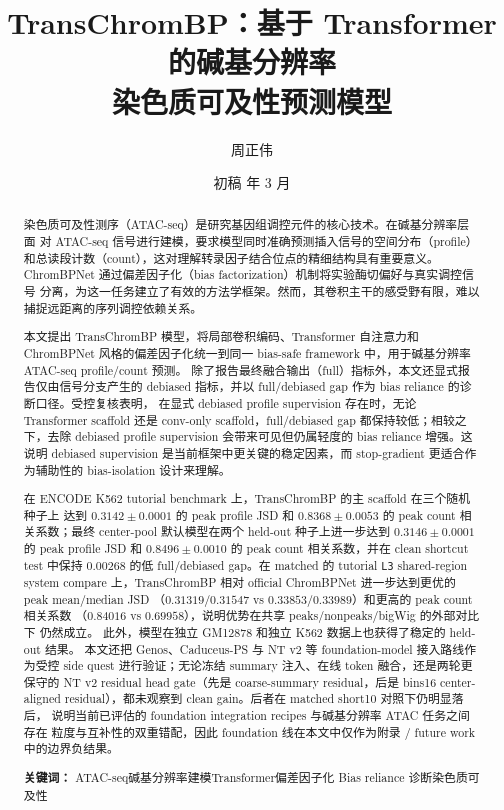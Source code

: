 \documentclass[11pt,a4paper]{ctexart}
\title{TransChromBP：基于 Transformer 的碱基分辨率\\
染色质可及性预测模型}
\author{周正伟}
\date{初稿\quad 2026 年 3 月}
\begin{document}
\maketitle

\begin{abstract}

染色质可及性测序（ATAC-seq）是研究基因组调控元件的核心技术。在碱基分辨率层面
对 ATAC-seq 信号进行建模，要求模型同时准确预测插入信号的空间分布（profile）
和总读段计数（count），这对理解转录因子结合位点的精细结构具有重要意义。
ChromBPNet 通过偏差因子化（bias factorization）机制将实验酶切偏好与真实调控信号
分离，为这一任务建立了有效的方法学框架。然而，其卷积主干的感受野有限，难以
捕捉远距离的序列调控依赖关系。

本文提出 TransChromBP 模型，将局部卷积编码、Transformer 自注意力和 ChromBPNet
风格的偏差因子化统一到同一 bias-safe framework 中，用于碱基分辨率
ATAC-seq profile/count 预测。
除了报告最终融合输出（full）指标外，本文还显式报告仅由信号分支产生的
debiased 指标，并以 full/debiased gap 作为 bias reliance 的诊断口径。受控复核表明，
在显式 debiased profile supervision 存在时，无论 Transformer scaffold 还是
conv-only scaffold，full/debiased gap 都保持较低；相较之下，去除 debiased profile
supervision 会带来可见但仍属轻度的 bias reliance 增强。这说明 debiased supervision
是当前框架中更关键的稳定因素，而 stop-gradient 更适合作为辅助性的 bias-isolation
设计来理解。

在 ENCODE K562 tutorial benchmark 上，TransChromBP 的主 scaffold 在三个随机种子上
达到 $0.3142 \pm 0.0001$ 的 peak profile JSD 和 $0.8368 \pm 0.0053$ 的 peak count
相关系数；最终 center-pool 默认模型在两个 held-out 种子上进一步达到
$0.3146 \pm 0.0001$ 的 peak profile JSD 和 $0.8496 \pm 0.0010$ 的 peak count
相关系数，并在 clean shortcut test 中保持 $0.00268$ 的低 full/debiased gap。在
matched 的 tutorial \texttt{L3} shared-region system compare 上，TransChromBP 相对
official ChromBPNet 进一步达到更优的 peak mean/median JSD
（$0.31319/0.31547$ vs $0.33853/0.33989$）和更高的 peak count 相关系数
（$0.84016$ vs $0.69958$），说明优势在共享 peaks/nonpeaks/bigWig 的外部对比下
仍然成立。
此外，模型在独立 GM12878 和独立 K562 数据上也获得了稳定的 held-out 结果。
本文还把 Genos、Caduceus-PS 与 NT v2 等 foundation-model 接入路线作为受控
side quest 进行验证；无论冻结 summary 注入、在线 token 融合，还是两轮更保守的
NT v2 residual head gate（先是 coarse-summary residual，后是 bins16 center-aligned
residual），都未观察到 clean gain。后者在 matched short10 对照下仍明显落后，
说明当前已评估的 foundation integration recipes 与碱基分辨率 ATAC 任务之间存在
粒度与互补性的双重错配，因此 foundation 线在本文中仅作为附录 / future work
中的边界负结果。

\bigskip
\noindent\textbf{关键词：}
ATAC-seq\quad 碱基分辨率建模\quad Transformer\quad 偏差因子化\quad
Bias reliance 诊断\quad 染色质可及性

\end{abstract}
\end{document}
